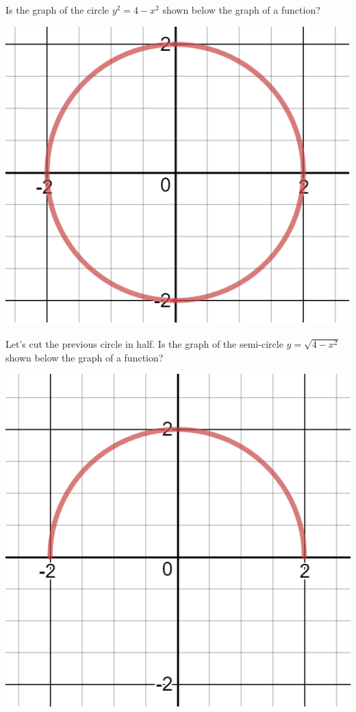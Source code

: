 \documentclass{ximera}
\begin{document}
\begin{problem}
  Is the graph of the circle $y^2 = 4 - x^2$ shown below the graph of a function?
  
  \begin{center} \includegraphics[scale=0.5]{functiondef1.png} \end{center}

  \begin{multipleChoice}
  \end{multipleChoice}

  \begin{problem}
        Let's cut the previous circle in half.  Is the graph of the semi-circle $y = \sqrt{4 - x^2}$ shown below the graph of a function?
        
        \begin{center} \includegraphics[scale=0.5]{functiondef2.png} \end{center}


\end{problem}
\end{problem}
\end{document}
